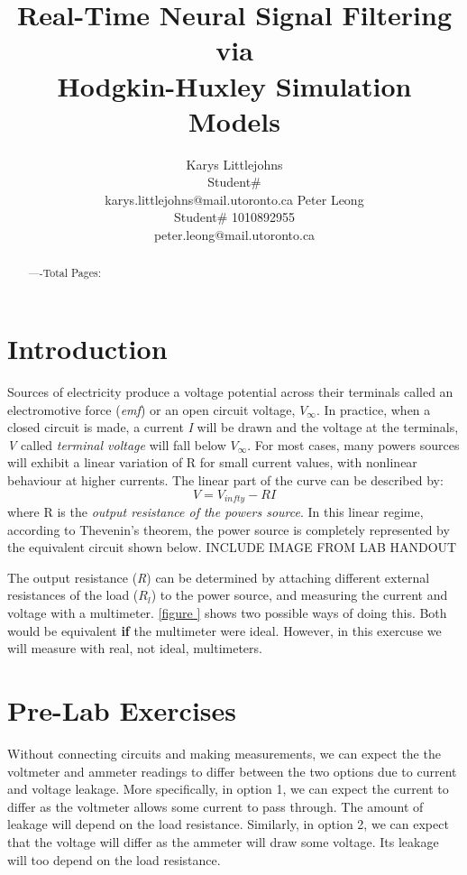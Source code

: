 \documentclass{article} %
\title{Real-Time Neural Signal Filtering via \\
Hodgkin-Huxley Simulation Models}
\author{Karys Littlejohns\\
Student\# \\
karys.littlejohns@mail.utoronto.ca
\And
Peter Leong \\
Student\# 1010892955 \\
peter.leong@mail.utoronto.ca \\
\AND
}
\begin{document}
\maketitle

\vspace{-6ex}

\begin{abstract}

----Total Pages: \pageref{last_page}
\end{abstract}

\vspace{2ex}

\section{Introduction}

Sources of electricity produce a voltage potential across their terminals called an electromotive force (\textit{emf}) or an open circuit voltage, $V_{\infty}$.
In practice, when a closed circuit is made, a current \textit{I} will be drawn and the voltage at the terminals, \textit{V} called \textit{terminal voltage} will fall below $V_{\infty}$.
For most cases, many powers sources will exhibit a linear variation of R for small current values, with nonlinear behaviour at higher currents.
The linear part of the curve can be described by:
\[
V = V_{infty} - RI
\]
where R is the \textit{output resistance of the powers source}.
In this linear regime, according to Thevenin's theorem, the power source is completely represented by the equivalent circuit shown below.
INCLUDE IMAGE FROM LAB HANDOUT

The output resistance (\textit{R}) can be determined by attaching different external resistances of the load ($R_{l}$) to the power source, and measuring the current and voltage with a multimeter.
\ref{figure } shows two possible ways of doing this. Both would be equivalent \textbf{if} the multimeter were ideal.
However, in this exercuse we will measure with real, not ideal, multimeters.

\section{Pre-Lab Exercises}

Without connecting circuits and making measurements, we can expect the the voltmeter and ammeter readings to differ between the two options due to current and voltage leakage.
More specifically, in option 1, we can expect the current to differ as the voltmeter allows some current to pass through. The amount of leakage will depend on the load resistance.
Similarly, in option 2, we can expect that the voltage will differ as the ammeter will draw some voltage. Its leakage will too depend on the load resistance.
\end{document}
